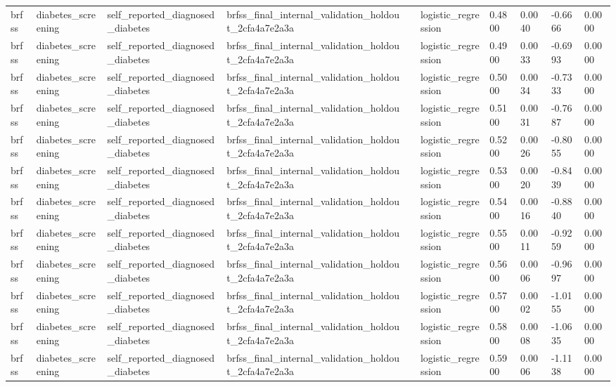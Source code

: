 \begin{tabular}{llllllllll}
brfss & diabetes\_screening & self\_reported\_diagnosed\_diabetes & brfss\_final\_internal\_validation\_holdout\_2cfa4a7e2a3a &  & logistic\_regression & 0.4800 & 0.0040 & -0.6666 & 0.0000 \\
brfss & diabetes\_screening & self\_reported\_diagnosed\_diabetes & brfss\_final\_internal\_validation\_holdout\_2cfa4a7e2a3a &  & logistic\_regression & 0.4900 & 0.0033 & -0.6993 & 0.0000 \\
brfss & diabetes\_screening & self\_reported\_diagnosed\_diabetes & brfss\_final\_internal\_validation\_holdout\_2cfa4a7e2a3a &  & logistic\_regression & 0.5000 & 0.0034 & -0.7333 & 0.0000 \\
brfss & diabetes\_screening & self\_reported\_diagnosed\_diabetes & brfss\_final\_internal\_validation\_holdout\_2cfa4a7e2a3a &  & logistic\_regression & 0.5100 & 0.0031 & -0.7687 & 0.0000 \\
brfss & diabetes\_screening & self\_reported\_diagnosed\_diabetes & brfss\_final\_internal\_validation\_holdout\_2cfa4a7e2a3a &  & logistic\_regression & 0.5200 & 0.0026 & -0.8055 & 0.0000 \\
brfss & diabetes\_screening & self\_reported\_diagnosed\_diabetes & brfss\_final\_internal\_validation\_holdout\_2cfa4a7e2a3a &  & logistic\_regression & 0.5300 & 0.0020 & -0.8439 & 0.0000 \\
brfss & diabetes\_screening & self\_reported\_diagnosed\_diabetes & brfss\_final\_internal\_validation\_holdout\_2cfa4a7e2a3a &  & logistic\_regression & 0.5400 & 0.0016 & -0.8840 & 0.0000 \\
brfss & diabetes\_screening & self\_reported\_diagnosed\_diabetes & brfss\_final\_internal\_validation\_holdout\_2cfa4a7e2a3a &  & logistic\_regression & 0.5500 & 0.0011 & -0.9259 & 0.0000 \\
brfss & diabetes\_screening & self\_reported\_diagnosed\_diabetes & brfss\_final\_internal\_validation\_holdout\_2cfa4a7e2a3a &  & logistic\_regression & 0.5600 & 0.0006 & -0.9697 & 0.0000 \\
brfss & diabetes\_screening & self\_reported\_diagnosed\_diabetes & brfss\_final\_internal\_validation\_holdout\_2cfa4a7e2a3a &  & logistic\_regression & 0.5700 & 0.0002 & -1.0155 & 0.0000 \\
brfss & diabetes\_screening & self\_reported\_diagnosed\_diabetes & brfss\_final\_internal\_validation\_holdout\_2cfa4a7e2a3a &  & logistic\_regression & 0.5800 & 0.0008 & -1.0635 & 0.0000 \\
brfss & diabetes\_screening & self\_reported\_diagnosed\_diabetes & brfss\_final\_internal\_validation\_holdout\_2cfa4a7e2a3a &  & logistic\_regression & 0.5900 & 0.0006 & -1.1138 & 0.0000 \\

\end{tabular}
